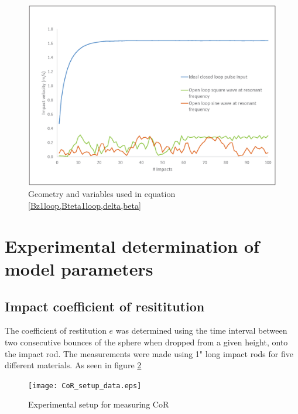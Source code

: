 \documentclass[letterpaper, 10 pt, conference]{ieeeconf}  %
\begin{document}
\begin{figure}
  \includegraphics[width=\linewidth]{close_vs_open_loop.eps}
  \caption{Geometry and variables used in equation \cref{Bz1loop,Bteta1loop,delta,beta}}
  \label{close_vs_open_loop}
\end{figure}


\section{Experimental determination of model parameters}

\subsection{Impact coefficient of resititution}

The coefficient of restitution $e$ was determined using the time interval between two consecutive bounces of the sphere when dropped from a given height, onto the impact rod. The measurements were made using 1" long impact rods for five different materials. As seen in figure \ref{CoR_setup_data}

\begin{figure}
	\texttt{[image: CoR\_setup\_data.eps]}
	\caption{Experimental setup for measuring CoR}
	\label{CoR_setup_data}
\end{figure}
\end{document}
